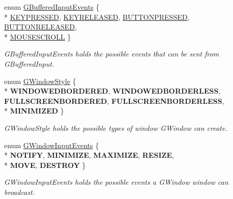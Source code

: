 \begin{DoxyCompactItemize}
\item 
enum \hyperlink{namespaceGW_1_1SYSTEM_a309fd3a92512dd2bfa8065d99c0d7fcb}{G\+Buffered\+Input\+Events} \{ \\*
\hyperlink{namespaceGW_1_1SYSTEM_a309fd3a92512dd2bfa8065d99c0d7fcbaf8bb58b0791c2d5d33b224213327f960}{K\+E\+Y\+P\+R\+E\+S\+S\+ED}, 
\hyperlink{namespaceGW_1_1SYSTEM_a309fd3a92512dd2bfa8065d99c0d7fcbabb708a216e7e8ef33cc542e6def7a688}{K\+E\+Y\+R\+E\+L\+E\+A\+S\+ED}, 
\hyperlink{namespaceGW_1_1SYSTEM_a309fd3a92512dd2bfa8065d99c0d7fcba56314f1a5b4d09751ed354a45a3a78fb}{B\+U\+T\+T\+O\+N\+P\+R\+E\+S\+S\+ED}, 
\hyperlink{namespaceGW_1_1SYSTEM_a309fd3a92512dd2bfa8065d99c0d7fcba9f7d6e613de276b27e471cd30eac08de}{B\+U\+T\+T\+O\+N\+R\+E\+L\+E\+A\+S\+ED}, 
\\*
\hyperlink{namespaceGW_1_1SYSTEM_a309fd3a92512dd2bfa8065d99c0d7fcbae4066728a571d6456cf5def5742a92bf}{M\+O\+U\+S\+E\+S\+C\+R\+O\+LL}
 \}\begin{DoxyCompactList}\small\item\em G\+Buffered\+Input\+Events holds the possible events that can be sent from G\+Buffered\+Input. \end{DoxyCompactList}
\item 
enum \hyperlink{namespaceGW_1_1SYSTEM_ad117891e556631f842625c348d36a071}{G\+Window\+Style} \{ \\*
{\bfseries W\+I\+N\+D\+O\+W\+E\+D\+B\+O\+R\+D\+E\+R\+ED}, 
{\bfseries W\+I\+N\+D\+O\+W\+E\+D\+B\+O\+R\+D\+E\+R\+L\+E\+SS}, 
{\bfseries F\+U\+L\+L\+S\+C\+R\+E\+E\+N\+B\+O\+R\+D\+E\+R\+ED}, 
{\bfseries F\+U\+L\+L\+S\+C\+R\+E\+E\+N\+B\+O\+R\+D\+E\+R\+L\+E\+SS}, 
\\*
{\bfseries M\+I\+N\+I\+M\+I\+Z\+ED}
 \}\hypertarget{namespaceGW_1_1SYSTEM_ad117891e556631f842625c348d36a071}{}\label{namespaceGW_1_1SYSTEM_ad117891e556631f842625c348d36a071}
\begin{DoxyCompactList}\small\item\em G\+Window\+Style holds the possible types of window G\+Window can create. \end{DoxyCompactList}
\item 
enum \hyperlink{namespaceGW_1_1SYSTEM_a7d3a00c7f94541cb6f446fde944ab309}{G\+Window\+Input\+Events} \{ \\*
{\bfseries N\+O\+T\+I\+FY}, 
{\bfseries M\+I\+N\+I\+M\+I\+ZE}, 
{\bfseries M\+A\+X\+I\+M\+I\+ZE}, 
{\bfseries R\+E\+S\+I\+ZE}, 
\\*
{\bfseries M\+O\+VE}, 
{\bfseries D\+E\+S\+T\+R\+OY}
 \}\hypertarget{namespaceGW_1_1SYSTEM_a7d3a00c7f94541cb6f446fde944ab309}{}\label{namespaceGW_1_1SYSTEM_a7d3a00c7f94541cb6f446fde944ab309}
\begin{DoxyCompactList}\small\item\em G\+Window\+Input\+Events holds the possible events a G\+Window window can broadcast. \end{DoxyCompactList}
\end{DoxyCompactItemize}
